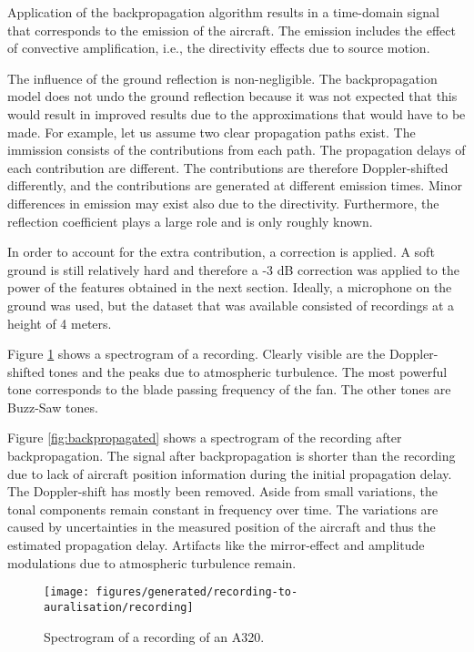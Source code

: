 \documentclass[10pt,twocolumn]{article}
\begin{document}
Application of the backpropagation algorithm results in a time-domain signal
that corresponds to the emission of the aircraft. The emission includes the
effect of convective amplification, i.e., the directivity effects due to source
motion.

The influence of the ground reflection is non-negligible. The backpropagation
model does not undo the ground reflection because it was not expected that this
would result in improved results due to the approximations that would have to be
made. For example, let us assume two clear propagation paths exist. The
immission consists of the contributions from each path. The propagation delays
of each contribution are different. The contributions are therefore
Doppler-shifted differently, and the contributions are generated at different
emission times. Minor differences in emission may exist also due to the
directivity. Furthermore, the reflection coefficient plays a large role and is
only roughly known.

In order to account for the extra contribution, a correction is applied. A soft
ground is still relatively hard and therefore a -3 dB correction was applied to
the power of the features obtained in the next section. Ideally, a microphone on
the ground was used, but the dataset that was available consisted of recordings
at a height of 4 meters.

Figure \ref{fig:recording} shows a spectrogram of a recording. Clearly visible
are the Doppler-shifted tones and the peaks due to atmospheric turbulence. The
most powerful tone corresponds to the blade passing frequency of the fan. The
other tones are Buzz-Saw tones.

Figure \ref{fig:backpropagated} shows a spectrogram of the recording after
backpropagation. The signal after backpropagation is shorter than the recording
due to lack of aircraft position information during the initial propagation
delay. The Doppler-shift has mostly been removed. Aside from small variations,
the tonal components remain constant in frequency over time. The variations are
caused by uncertainties in the measured position of the aircraft and thus the
estimated propagation delay. Artifacts like the mirror-effect and amplitude
modulations due to atmospheric turbulence remain.

\begin{figure}[H]
  \centering
  \texttt{[image: figures/generated/recording-to-auralisation/recording]}
  \caption{
    Spectrogram of a recording of an A320. }
  \label{fig:recording}
\end{figure}
\end{document}
